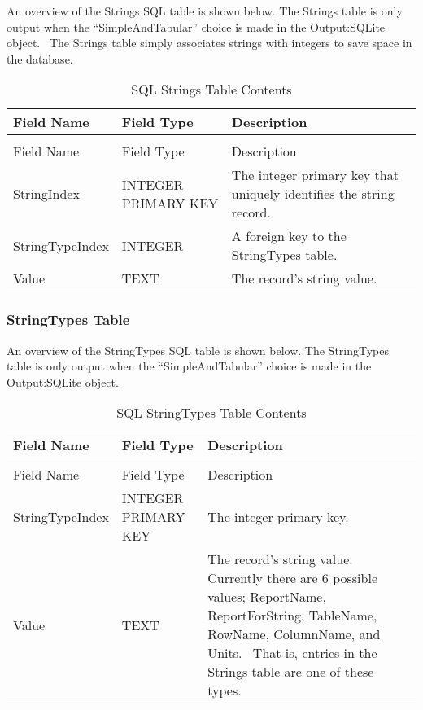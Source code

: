An overview of the Strings SQL table is shown below. The Strings table is only output when the “SimpleAndTabular” choice is made in the Output:SQLite object.  The Strings table simply associates strings with integers to save space in the database.

\begin{longtable}[c]{>{\raggedright}p{1.5in}>{\raggedright}p{1.5in}>{\raggedright}p{3in}}
\caption{SQL Strings Table Contents \label{table:table-39.-sql-strings-table-contents}} \tabularnewline
\toprule 
Field Name & Field Type & Description \tabularnewline
\midrule
\endfirsthead

\caption[]{SQL Strings Table Contents} \tabularnewline
\toprule 
Field Name & Field Type & Description \tabularnewline
\midrule
\endhead

StringIndex & INTEGER PRIMARY KEY & The integer primary key that uniquely identifies the string record. \tabularnewline
StringType\-Index & INTEGER & A foreign key to the StringTypes table. \tabularnewline
Value & TEXT & The record’s string value. \tabularnewline
\bottomrule
\end{longtable}

\subsubsection{StringTypes Table}

An overview of the StringTypes SQL table is shown below. The StringTypes table is only output when the “SimpleAndTabular” choice is made in the Output:SQLite object.

\begin{longtable}[c]{>{\raggedright}p{1.5in}>{\raggedright}p{1.5in}>{\raggedright}p{3in}}
\caption{SQL StringTypes Table Contents \label{table:table-40.-sql-stringtypes-table-contents}} \tabularnewline
\toprule 
Field Name & Field Type & Description \tabularnewline
\midrule
\endfirsthead

\caption[]{SQL StringTypes Table Contents} \tabularnewline
\toprule 
Field Name & Field Type & Description \tabularnewline
\midrule
\endhead

StringType\-Index & INTEGER PRIMARY KEY & The integer primary key. \tabularnewline
Value & TEXT & The record’s string value.~ Currently there are 6 possible values; ReportName, ReportForString, TableName, RowName, ColumnName, and Units.~ That is, entries in the Strings table are one of these types. \tabularnewline
\bottomrule
\end{longtable}


